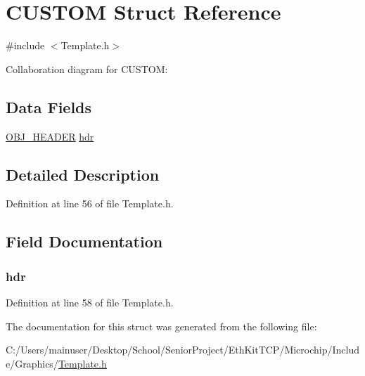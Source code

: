 \hypertarget{struct_c_u_s_t_o_m}{}\section{C\+U\+S\+T\+O\+M Struct Reference}
\label{struct_c_u_s_t_o_m}


{\ttfamily \#include $<$Template.\+h$>$}



Collaboration diagram for C\+U\+S\+T\+O\+M\+:
\subsection*{Data Fields}
\begin{DoxyCompactItemize}
\item 
\hyperlink{struct_o_b_j___h_e_a_d_e_r}{O\+B\+J\+\_\+\+H\+E\+A\+D\+E\+R} \hyperlink{struct_c_u_s_t_o_m_abeffaf353197a8a64fba6707b68ce0be}{hdr}
\end{DoxyCompactItemize}


\subsection{Detailed Description}


Definition at line 56 of file Template.\+h.



\subsection{Field Documentation}
\hypertarget{struct_c_u_s_t_o_m_abeffaf353197a8a64fba6707b68ce0be}{}
\subsubsection[{hdr}]{ hdr}\label{struct_c_u_s_t_o_m_abeffaf353197a8a64fba6707b68ce0be}


Definition at line 58 of file Template.\+h.



The documentation for this struct was generated from the following file\+:\begin{DoxyCompactItemize}
\item 
C\+:/\+Users/mainuser/\+Desktop/\+School/\+Senior\+Project/\+Eth\+Kit\+T\+C\+P/\+Microchip/\+Include/\+Graphics/\hyperlink{_template_8h}{Template.\+h}\end{DoxyCompactItemize}
